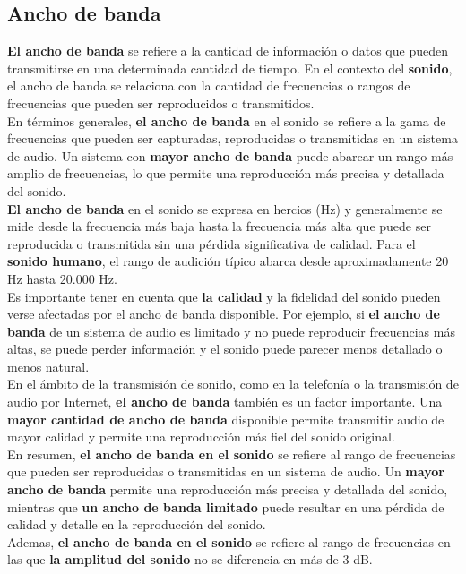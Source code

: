 \documentclass[
	12pt, %
	fleqn, %
	a4paper, %
	oneside, %
]{LegrandOrangeBook}
\begin{document}
\subsection{Ancho de banda}
\textbf{El ancho de banda} se refiere a la cantidad de información o datos que pueden transmitirse en una determinada cantidad de tiempo. En el contexto del \textbf{sonido}, el ancho de banda se relaciona con la cantidad de frecuencias o rangos de frecuencias que pueden ser reproducidos o transmitidos.\\
En términos generales, \textbf{el ancho de banda} en el sonido se refiere a la gama de frecuencias que pueden ser capturadas, reproducidas o transmitidas en un sistema de audio. Un sistema con \textbf{mayor ancho de banda} puede abarcar un rango más amplio de frecuencias, lo que permite una reproducción más precisa y detallada del sonido.\\
\textbf{El ancho de banda} en el sonido se expresa en hercios (Hz) y generalmente se mide desde la frecuencia más baja hasta la frecuencia más alta que puede ser reproducida o transmitida sin una pérdida significativa de calidad. Para el \textbf{sonido humano}, el rango de audición típico abarca desde aproximadamente 20 Hz hasta 20.000 Hz.\\
Es importante tener en cuenta que \textbf{la calidad} y la fidelidad del sonido pueden verse afectadas por el ancho de banda disponible. Por ejemplo, si \textbf{el ancho de banda} de un sistema de audio es limitado y no puede reproducir frecuencias más altas, se puede perder información y el sonido puede parecer menos detallado o menos natural.\\
En el ámbito de la transmisión de sonido, como en la telefonía o la transmisión de audio por Internet, \textbf{el ancho de banda} también es un factor importante. Una \textbf{mayor cantidad de ancho de banda} disponible permite transmitir audio de mayor calidad y permite una reproducción más fiel del sonido original.\\
En resumen, \textbf{el ancho de banda en el sonido} se refiere al rango de frecuencias que pueden ser reproducidas o transmitidas en un sistema de audio. Un \textbf{mayor ancho de banda} permite una reproducción más precisa y detallada del sonido, mientras que \textbf{un ancho de banda limitado} puede resultar en una pérdida de calidad y detalle en la reproducción del sonido.\\
Ademas, \textbf{el ancho de banda en el sonido} se refiere al rango de frecuencias en las que \textbf{la amplitud del sonido} no se diferencia en más de 3 dB.\\
\end{document}

